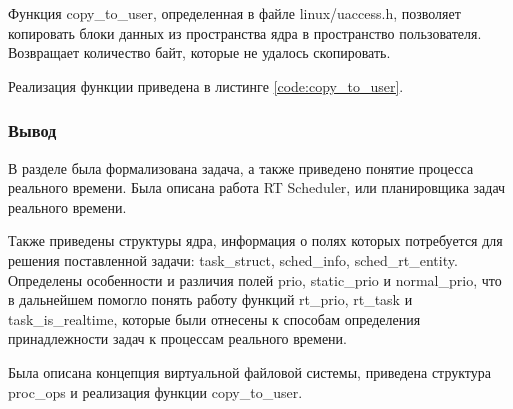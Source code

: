 Функция copy\_to\_user, определенная в файле linux/uaccess.h, позволяет копировать блоки данных из пространства ядра в пространство пользователя. Возвращает количество байт, которые не удалось скопировать. \cite{universityOfBirningham}

Реализация функции приведена в листинге \ref{code:copy_to_user}.


\subsubsection*{Вывод}
В разделе была формализована задача, а также приведено понятие процесса реального времени. Была описана работа RT Scheduler, или планировщика задач реального времени. 

Также приведены структуры ядра, информация о полях которых потребуется для решения поставленной задачи: task\_struct, sched\_info, sched\_rt\_entity. Определены особенности и различия полей prio, static\_prio и normal\_prio, что в дальнейшем помогло понять работу функций rt\_prio, rt\_task и task\_is\_realtime, которые были отнесены к способам определения принадлежности задач к процессам реального времени.

Была описана концепция виртуальной файловой системы, приведена структура proc\_ops и реализация функции copy\_to\_user.

\pagebreak